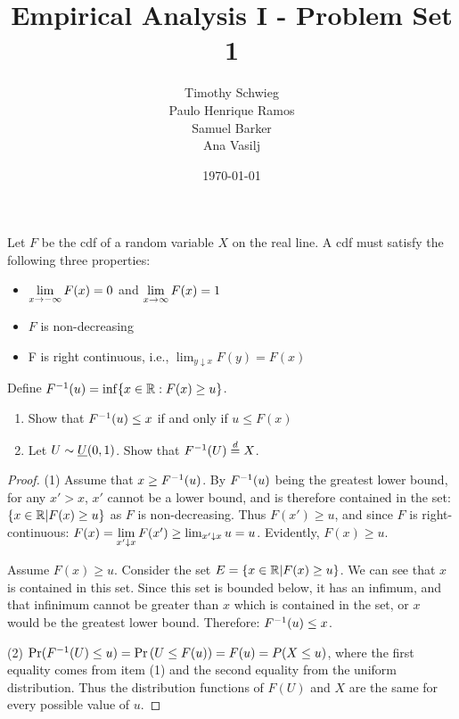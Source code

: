 \documentclass[12pt, letterpaper]{paper}
\begin{document}
\author{
{Timothy Schwieg}\\
{Paulo Henrique Ramos}\\
{Samuel Barker}\\
{Ana Vasilj}
}

\date{\today}
\title{Empirical Analysis I -  Problem Set 1}


\maketitle

\begin{question}
  Let $F$ be the cdf of a random variable $X$ on the real line. A cdf
  must satisfy the following three properties:
  \begin{itemize}
  \item $\lim\limits_{x \to -\infty} F(x) = 0$ and $\lim\limits_{x \to \infty} F(x) = 1$
  \item $F$ is non-decreasing
  \item F is right continuous, i.e., $\lim_{y \downarrow x} F(y) = F(x)$
  \end{itemize}
  Define ${F}^{-1}(u) = \inf\{ x \in \mathbb{R} : F(x) \geq u\}$.
  \begin{enumerate}
  \item Show that ${F}^{-1}(u) \leq x$ if and only if $u \leq F(x)$
  \item Let $U \sim \emph{U}(0,1)$. Show that ${F}^{-1}(U) \overset{d}{=} X$.
  \end{enumerate}

  \begin{proof}
    (1) Assume that $x \geq {F}^{-1}(u)$. By ${F}^{-1}(u)$ being the
    greatest lower bound, for any $x' > x$, $x'$ cannot be a lower
    bound, and is therefore contained in the set:
    $\{ x \in \mathbb{R} | F(x) \geq u \}$ as $F$ is non-decreasing. Thus
    $F(x') \geq u$, and since $F$ is right-continuous:
    $F(x) = \lim\limits_{x' \downarrow x}F( x') \geq \lim_{x' \downarrow x} u = u$. Evidently,
    $F(x) \geq u$.

    Assume $F(x) \geq u$. Consider the set
    $E = \{ x \in \mathbb{R} | F(x) \geq u\}$. We can see that $x$ is contained
    in this set. Since this set is bounded below, it has an infimum,
    and that infinimum cannot be greater than $x$ which is contained
    in the set, or $x$ would be the greatest lower bound. Therefore:
    ${F}^{-1}(u) \leq x$.

    \vspace{.25in}

    (2)
    $\Pr( {F}^{-1}(U) \leq u) = \Pr \left( U \leq F(u) \right ) = F(u) = P(X
    \leq u)$, where the first equality comes from item (1) and the second
    equality from the uniform distribution. Thus the distribution
    functions of $F(U)$ and $X$ are the same for every possible value
    of $u$.
  \end{proof}
\end{question}
\end{document}
